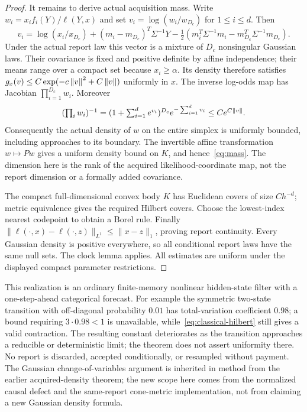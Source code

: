 \begin{proof}
It remains to derive actual acquisition mass. Write
$w_i=x_if_i(Y)/\ell(Y,x)$ and set $v_i=\log(w_i/w_{D_c})$ for $1\le i\le d$. Then
\[
 v_i=\log(x_i/x_{D_c})+(m_i-m_{D_c})^T\Sigma^{-1}Y
 -\tfrac12(m_i^T\Sigma^{-1}m_i-m_{D_c}^T\Sigma^{-1}m_{D_c}).
\]
Under the actual report law this vector is a mixture of $D_c$ nonsingular Gaussian laws. Their covariance is fixed and positive definite by affine independence; their means range over a compact set because $x_i\ge\alpha$. Its density therefore satisfies $g_x(v)\le C\exp(-c\left\lVert v\right\rVert^2+C\left\lVert v\right\rVert)$ uniformly in $x$. The inverse log-odds map has Jacobian $\prod_{i=1}^{D_c}w_i$. Moreover
\[
 (\textstyle\prod_i w_i)^{-1}
 =(1+\textstyle\sum_{i=1}^d e^{v_i})^{D_c}e^{-\sum_{i=1}^dv_i}
 \le C e^{C\left\lVert v\right\rVert}.
\]
Consequently the actual density of $w$ on the entire simplex is uniformly bounded, including approaches to its boundary. The invertible affine transformation $w\mapsto Pw$ gives a uniform density bound on $K$, and hence~\eqref{eq:mass}. The dimension here is the rank of the acquired likelihood-coordinate map, not the report dimension or a formally added covariance.

The compact full-dimensional convex body $K$ has Euclidean covers of size $Ch^{-d}$; metric equivalence gives the required Hilbert covers. Choose the lowest-index nearest codepoint to obtain a Borel rule. Finally
$\|\ell(\cdot,x)-\ell(\cdot,z)\|_{L^1}\le\|x-z\|_1$, proving report continuity. Every Gaussian density is positive everywhere, so all conditional report laws have the same null sets. The clock lemma applies. All estimates are uniform under the displayed compact parameter restrictions.
\end{proof}

This realization is an ordinary finite-memory nonlinear hidden-state filter with a one-step-ahead categorical forecast. For example the symmetric two-state transition with off-diagonal probability $0.01$ has total-variation coefficient $0.98$; a bound requiring $3\cdot0.98<1$ is unavailable, while~\eqref{eq:classical-hilbert} still gives a valid contraction. The resulting constant deteriorates as the transition approaches a reducible or deterministic limit; the theorem does not assert uniformity there. No report is discarded, accepted conditionally, or resampled without payment. The Gaussian change-of-variables argument is inherited in method from the earlier acquired-density theorem; the new scope here comes from the normalized causal defect and the same-report cone-metric implementation, not from claiming a new Gaussian density formula.
